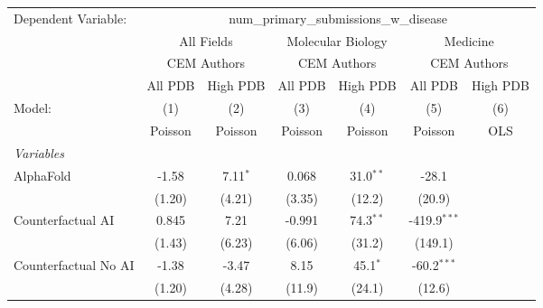 \begingroup
\centering
\begin{tabular}{lcccccc}
   \tabularnewline \midrule \midrule
   Dependent Variable: & \multicolumn{6}{c}{num\_primary\_submissions\_w\_disease}\\
 & \multicolumn{2}{c}{All Fields} & \multicolumn{2}{c}{Molecular Biology} & \multicolumn{2}{c}{Medicine} \\
\cmidrule(lr){2-3} \cmidrule(lr){4-5} \cmidrule(lr){6-7}
 & \multicolumn{2}{c}{CEM Authors} & \multicolumn{2}{c}{CEM Authors} & \multicolumn{2}{c}{CEM Authors} \\
\cmidrule(lr){2-3} \cmidrule(lr){4-5} \cmidrule(lr){6-7}
 & \multicolumn{1}{c}{All PDB} & \multicolumn{1}{c}{High PDB} & \multicolumn{1}{c}{All PDB} & \multicolumn{1}{c}{High PDB} & \multicolumn{1}{c}{All PDB} & \multicolumn{1}{c}{High PDB} \\
\cmidrule(lr){2-2} \cmidrule(lr){3-3} \cmidrule(lr){4-4} \cmidrule(lr){5-5} \cmidrule(lr){6-6} \cmidrule(lr){7-7}
   Model:                                                     & (1)          & (2)           & (3)          & (4)            & (5)            & (6)\\  
                                                              &  Poisson     & Poisson       & Poisson      & Poisson        & Poisson        & OLS\\  
   \midrule
   \emph{Variables}\\
   AlphaFold                                                  & -1.58        & 7.11$^{*}$    & 0.068        & 31.0$^{**}$    & -28.1          &   \\   
                                                              & (1.20)       & (4.21)        & (3.35)       & (12.2)         & (20.9)         &   \\   
   Counterfactual AI                                          & 0.845        & 7.21          & -0.991       & 74.3$^{**}$    & -419.9$^{***}$ &   \\   
                                                              & (1.43)       & (6.23)        & (6.06)       & (31.2)         & (149.1)        &   \\   
   Counterfactual No AI                                       & -1.38        & -3.47         & 8.15         & 45.1$^{*}$     & -60.2$^{***}$  &   \\   
                                                              & (1.20)       & (4.28)        & (11.9)       & (24.1)         & (12.6)         &   \\   

\end{tabular}

